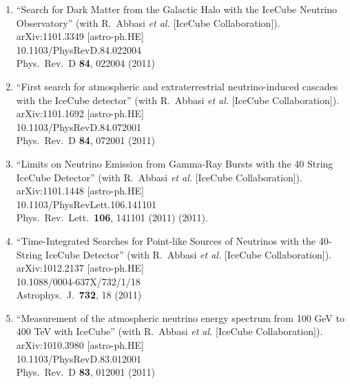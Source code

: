 \begin{enumerate}
\item ``Search for Dark Matter from the Galactic Halo with
        the IceCube   Neutrino Observatory'' (with R.~Abbasi
        {\it et al.}  [IceCube     Collaboration]).
        \\{}arXiv:1101.3349 [astro-ph.HE]
        \\{}10.1103/PhysRevD.84.022004 \\{}Phys.\ Rev.\ D
        {\bf 84}, 022004   (2011) %

\item ``First search for atmospheric and extraterrestrial
        neutrino-induced   cascades with the IceCube
        detector'' (with R.~Abbasi {\it et al.}   [IceCube
        Collaboration]).  \\{}arXiv:1101.1692 [astro-ph.HE]
        \\{}10.1103/PhysRevD.84.072001 \\{}Phys.\ Rev.\ D
        {\bf 84}, 072001   (2011) %

\item ``Limits on Neutrino Emission from Gamma-Ray Bursts
        with the 40 String   IceCube Detector'' (with
        R.~Abbasi {\it et al.}  [IceCube
        Collaboration]).  \\{}arXiv:1101.1448 [astro-ph.HE]
        \\{}10.1103/PhysRevLett.106.141101 \\{}Phys.\ Rev.\
        Lett.\ {\bf     106}, 141101 (2011) %
        (2011).

\item ``Time-Integrated Searches for Point-like Sources of
        Neutrinos with   the 40-String IceCube Detector''
        (with R.~Abbasi {\it et al.}   [IceCube
        Collaboration]).  \\{}arXiv:1012.2137 [astro-ph.HE]
        \\{}10.1088/0004-637X/732/1/18 \\{}Astrophys.\ J.\
        {\bf 732}, 18   (2011) %

\item ``Measurement of the atmospheric neutrino energy
        spectrum from 100 GeV   to 400 TeV with IceCube''
        (with R.~Abbasi {\it et al.}  [IceCube
        Collaboration]).  \\{}arXiv:1010.3980 [astro-ph.HE]
        \\{}10.1103/PhysRevD.83.012001 \\{}Phys.\ Rev.\ D
        {\bf 83}, 012001   (2011) %


\end{enumerate}

